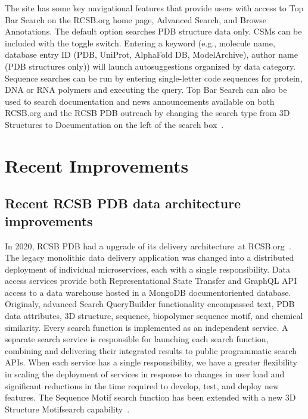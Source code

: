 \documentclass{report}
\begin{document}
The site has some key navigational features that provide users with access to Top Bar Search on the RCSB.org home page, Advanced Search, and Browse Annotations. The default option searches PDB structure data only. CSMs can be included with the toggle switch. Entering a keyword (e.g., molecule name, database entry ID (PDB, UniProt, AlphaFold DB, ModelArchive), author name (PDB structures only)) will launch autosuggestions organized by data category. Sequence searches can be run by entering single-letter code sequences for protein, DNA or RNA polymers and executing the query. Top Bar Search can also be used to search documentation and news announcements available on both RCSB.org and the RCSB PDB outreach by changing the search type from 3D Structures to Documentation on the left of the search box~\cite{burley1_rcsb_2022}.

\section{Recent Improvements}

\subsection*{Recent RCSB PDB data architecture improvements}

In 2020, RCSB PDB had a upgrade of its delivery architecture~\cite{rose_rcsb_2021}at RCSB.org~\cite{powerful_rcsb_2021}. The legacy monolithic data delivery application  was changed into a distributed deployment of individual microservices, each with a single responsibility. Data access services provide both Representational State Transfer and GraphQL API access to a data warehouse hosted in a MongoDB  documentoriented database. Originaly, advanced Search QueryBuilder functionality encompassed text, PDB data attributes, 3D structure, sequence, biopolymer sequence motif, and chemical similarity. Every search function is implemented as an independent service. A separate search service is responsible for launching each search function, combining and delivering their integrated results to public programmatic search APIs. When each service has a single responsibility, we have a greater flexibility in scaling the deployment of services in response to changes in user load and significant reductions in the time required to develop, test, and deploy new features. The Sequence Motif search function has been extended with a new 3D Structure Motifsearch capability~\cite{bittrich_real-time_2020}. 
\end{document}
